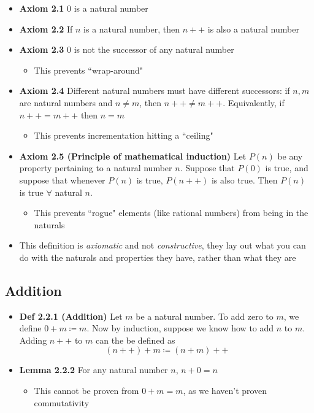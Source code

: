 \documentclass[12pt]{article}
\begin{document}
\begin{itemize}
  \item \textbf{Axiom 2.1} 0 is a natural number
  \item \textbf{Axiom 2.2} If $n$ is a natural number, then $n++$ is also a natural number
  \item \textbf{Axiom 2.3} 0 is not the successor of any natural number
  \begin{itemize}
    \item This prevents ``wrap-around"
  \end{itemize}
  \item \textbf{Axiom 2.4} Different natural numbers must have different successors: if $n, m$ are natural numbers and $n \neq m$, then $n++ \neq m++$. Equivalently, if $n++ = m++$ then $n = m$
    \begin{itemize}
      \item This prevents incrementation hitting a ``ceiling"
    \end{itemize}
  \item \textbf{Axiom 2.5 (Principle of mathematical induction)} Let $P(n)$ be any property pertaining to a natural number $n$. Suppose that $P(0)$ is true, and suppose that whenever $P(n)$ is true, $P(n++)$ is also true. Then $P(n)$ is true $\forall$ natural $n$.
  \begin{itemize}
    \item This prevents ``rogue" elements (like rational numbers) from being in the naturals
  \end{itemize}
  \item This definition is \textit{axiomatic} and not \textit{constructive}, they lay out what you can do with the naturals and properties they have, rather than what they are
\end{itemize}

\subsection{Addition}

\begin{itemize}
  \item \textbf{Def 2.2.1 (Addition)} Let $m$ be a natural number. To add zero to $m$, we define $0 + m \coloneqq m$. Now by induction, suppose we know how to add $n$ to $m$. Adding $n++$ to $m$ can the be defined as
  \[
    (n++)+m \coloneqq (n+m)++
  \]
  \item \textbf{Lemma 2.2.2} For any natural number $n$, $n+0 = n$
  \begin{itemize}
    \item This cannot be proven from $0 + m = m$, as we haven't proven commutativity
  \end{itemize}
\end{itemize}
\end{document}
